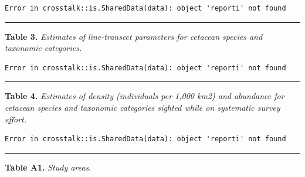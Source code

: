 \documentclass[
]{book}
\newenvironment{Shaded}{\begin{snugshade}}{\end{snugshade}}
\newcommand{\NormalTok}[1]{#1}
\newcommand{\SpecialCharTok}[1]{\textcolor[rgb]{0.00,0.00,0.00}{#1}}
\begin{document}
\begin{Shaded}
\end{Shaded}

\begin{verbatim}
Error in crosstalk::is.SharedData(data): object 'reporti' not found
\end{verbatim}

\begin{center}\rule{0.5\linewidth}{0.5pt}\end{center}

\textbf{Table 3.} \emph{Estimates of line-transect parameters for cetacean species and taxonomic categories.}

\begin{Shaded}
\end{Shaded}

\begin{verbatim}
Error in crosstalk::is.SharedData(data): object 'reporti' not found
\end{verbatim}

\begin{center}\rule{0.5\linewidth}{0.5pt}\end{center}

\textbf{Table 4.} \emph{Estimates of density (individuals per 1,000 km2) and abundance for cetacean species and taxonomic categories sighted while on systematic survey effort.}

\begin{Shaded}
\end{Shaded}

\begin{verbatim}
Error in crosstalk::is.SharedData(data): object 'reporti' not found
\end{verbatim}

\begin{center}\rule{0.5\linewidth}{0.5pt}\end{center}

\textbf{Table A1.} \emph{Study areas}.
\end{document}
